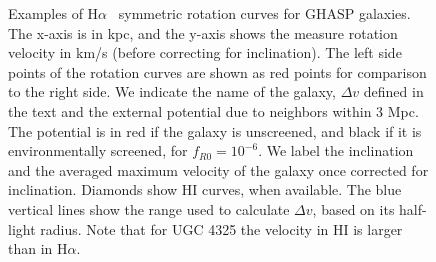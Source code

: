 \documentclass[twocolappendix, numberedappendix]{emulateapj}
\newcommand{\ha}{H$\alpha$}
\begin{document}
\begin{figure}
\caption{Examples of \ha~ symmetric rotation curves for GHASP galaxies.  The x-axis  is in kpc, and the y-axis shows the measure rotation velocity in km/s (before 
correcting for inclination). The
left side points of the rotation curves are shown as red points for comparison 
to the right side. We indicate the
name of the galaxy,  $\Delta v$ defined in the text and the external 
potential due to neighbors within 3 Mpc. 
The potential is  
in red if the galaxy is unscreened, 
and black if it is environmentally screened, for $f_{R0}=10^{-6}$. 
We label the inclination and the averaged maximum velocity of the galaxy
once corrected for inclination.
Diamonds show HI curves, when available. The blue vertical lines show the range 
used to calculate $\Delta v$, based on its half-light radius. Note that for UGC 4325
the velocity in HI is larger than in \ha{}.  
\label{fig:GHASPsym}}
\end{figure}
\end{document}
